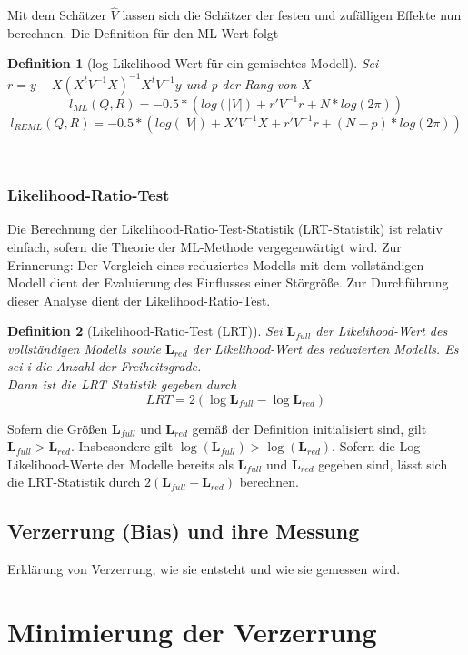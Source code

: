 \documentclass[%
thesis=student,%
coverpage=false,%
titlepage=false,%
headmarks=true, %
german,%
font=libertine, %
math=newpxtx, %
BCOR=5mm,%
coverBCOR=11mm%
]{tumbook}
\theoremstyle{break}
\newtheorem{definition}{Definition}[section]
\begin{document}
Mit dem Schätzer $\hat{V}$ lassen sich die Schätzer der festen und zufälligen Effekte nun berechnen.
Die Definition für den ML Wert folgt 
\begin{definition}[log-Likelihood-Wert für ein gemischtes Modell]
	Sei $r = y - X(X^tV^{-1}X)^{-1}X^tV^{-1}y$ und p der Rang von X
	$$ l_{ML}(Q,R) = -0.5 * (log(|V|)+ r'V^{-1}r + N * log(2\pi))$$
	$$l_{REML}(Q,R) = -0.5 * (log(|V|)+ X'V^{-1}X + r'V^{-1}r+ (N-p) * log(2\pi))$$
\end{definition}\noindent
\
\subsection{Likelihood-Ratio-Test}
Die Berechnung der Likelihood-Ratio-Test-Statistik (LRT-Statistik) ist relativ einfach, sofern die Theorie der ML-Methode vergegenwärtigt wird. Zur Erinnerung: Der Vergleich eines reduziertes Modells mit dem vollständigen Modell dient der Evaluierung des Einflusses einer Störgröße. Zur Durchführung dieser Analyse dient der Likelihood-Ratio-Test.
\begin{definition}[Likelihood-Ratio-Test (LRT)] 
	Sei $\mathbf{L}_{full}$ der Likelihood-Wert des vollständigen Modells sowie $\mathbf{L}_{red}$ der Likelihood-Wert des reduzierten Modells. Es sei i die Anzahl der Freiheitsgrade.\\
	Dann ist die LRT Statistik gegeben durch 
	$$ LRT = 2(\log \mathbf{L}_{full}- \log \mathbf{L}_{red}) $$ 
\end{definition} \noindent
Sofern die Größen $\mathbf{L}_{full}$ und $\mathbf{L}_{red}$ gemäß der Definition initialisiert sind, gilt $\mathbf{L}_{full} > \mathbf{L}_{red}$. Insbesondere gilt $\log(\mathbf{L}_{full}) > \log(\mathbf{L}_{red})$.
Sofern die Log-Likelihood-Werte der Modelle bereits als $\mathbf{L}_{full}$ und $\mathbf{L}_{red}$ gegeben sind, lässt sich die LRT-Statistik durch $2(\mathbf{L}_{full} - \mathbf{L}_{red})$ berechnen. \\

\section{Verzerrung (Bias) und ihre Messung}
Erklärung von Verzerrung, wie sie entsteht und wie sie gemessen wird.

\chapter{Minimierung der Verzerrung}
\end{document}
